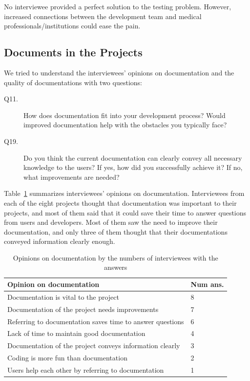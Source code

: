 \documentclass[final, 3p, times, authoryear]{elsarticle}
\begin{document}
No interviewee provided a perfect solution to the testing problem. However,
increased connections between the development team and medical
professionals/institutions could ease the pain.

\subsection{Documents in the Projects} \label{sec_interview_documents}

We tried to understand the interviewees' opinions on documentation and the
quality of documentations with two questions:

\begin{description}
\item[Q11.] How does documentation fit into your development process? Would
improved documentation help with the obstacles you typically face?
\item[Q19.] Do you think the current documentation can clearly convey all
necessary knowledge to the users? If yes, how did you successfully achieve it?
If no, what improvements are needed?
\end{description}

Table~\ref{tab_opinion_doc} summarizes interviewees' opinions on documentation.
Interviewees from each of the eight projects thought that documentation was
important to their projects, and most of them said that it could save their time
to answer questions from users and developers. Most of them saw the need to
improve their documentation, and only three of them thought that their
documentations conveyed information clearly enough. 

\begin{table}[!ht]
\centering
\begin{tabular}{ll}
\toprule
Opinion on documentation & Num ans. \\ 
\midrule
Documentation is vital to the project & 8 \\
Documentation of the project needs improvements & 7 \\
Referring to documentation saves time to answer questions & 6 \\
Lack of time to maintain good documentation & 4 \\
Documentation of the project conveys information clearly & 3 \\
Coding is more fun than documentation & 2 \\
Users help each other by referring to documentation & 1 \\ 
\bottomrule
\end{tabular}
\caption{\label{tab_opinion_doc}Opinions on documentation by the numbers of
interviewees with the answers}
\end{table}
\end{document}
